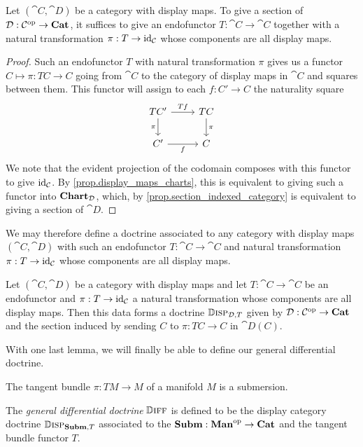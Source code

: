 \documentclass[DynamicalBook]{subfiles}
\begin{document}
\begin{corollary}
Let $(\cat{C}, \cat{D})$ be a category with display maps. To give a section of
$\mathcal{D} : \mathcal{C}^{\textnormal{op}} \to \textbf{Cat}$, it suffices to give an endofunctor $T :
\cat{C} \to \cat{C}$ together with a natural transformation $\pi : T \to
\mathrm{id}_{\mathcal{C}}$ whose components are all display maps.
\end{corollary}
\begin{proof}
Such an endofunctor $T$ with natural transformation $\pi$ gives us a functor $C
\mapsto \pi : TC \to C$ going from $\cat{C}$ to the category of display maps in
$\cat{C}$ and squares between them. This functor will assign to each $f : C' \to
C$ the naturality square 
\[
\begin{tikzcd}
TC' \arrow[d, "\pi"'] \arrow[r, "Tf"] & TC \arrow[d, "\pi"] \\
C' \arrow[r, "f"']                                & C
\end{tikzcd}
\]
We note that the evident projection of the codomain composes with this functor
to give $\mathrm{id}_{\mathcal{C}}$. By \cref{prop.display_maps_charts}, this is equivalent
to giving such a functor into $\textbf{Chart}_{\mathcal{D}}$, which, by
\cref{prop.section_indexed_category} is equivalent to giving a section of
$\cat{D}$.
\end{proof}

We may therefore define a doctrine associated to any category with display maps
$(\cat{C}, \cat{D})$ with such an endofunctor $T : \cat{C} \to \cat{C}$ and
natural transformation $\pi : T \to \mathrm{id}_{\mathcal{C}}$ whose components are all
display maps.

\begin{definition}
Let $(\cat{C}, \cat{D})$ be a category with display maps and let $T : \cat{C}
\to \cat{C}$ be an endofunctor and
$\pi : T \to \mathrm{id}_{\mathcal{C}}$ a natural transformation whose components are all
display maps. Then this data forms a doctrine $\mathbb{D}\textsc{isp}_{\mathcal{D}, T}$ given by $\mathcal{D} : \mathcal{C}^{\textnormal{op}} \to
\textbf{Cat}$ and the section induced by sending $C$ to $\pi : TC \to C$ in $\cat{D}(C)$.
\end{definition}

With one last lemma, we will finally be able to define our general differential doctrine.
\begin{lemma}
The tangent bundle $\pi : TM \to M$ of a manifold $M$ is a submersion.
\end{lemma}

\begin{definition}
The \emph{general differential doctrine} $\mathbb{D}\textsc{iff}$ is defined to be the display
category doctrine
$\mathbb{D}\textsc{isp}_{\textbf{Subm}, T}$ associated to the $\textbf{Subm} : \textbf{Man}^{\textnormal{op}} \to
\textbf{Cat}$ and the tangent bundle functor $T$.
\end{definition}
\end{document}
